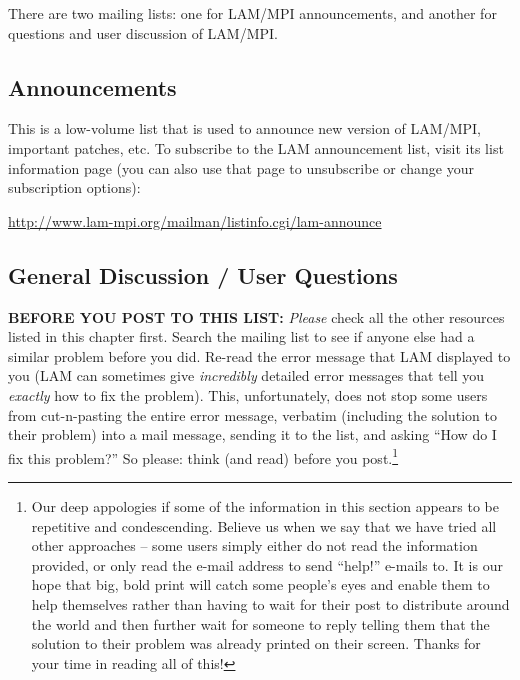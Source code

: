 There are two mailing lists: one for LAM/MPI announcements, and
another for questions and user discussion of LAM/MPI.


\subsection{Announcements}
  
This is a low-volume list that is used to announce new version of
LAM/MPI, important patches, etc.  To subscribe to the LAM announcement
list, visit its list information page (you can also use that page to
unsubscribe or change your subscription options):

\vspace{11pt}

\centerline{\url{http://www.lam-mpi.org/mailman/listinfo.cgi/lam-announce}}

\vspace{11pt}

  

\subsection{General Discussion / User Questions}

{\bf BEFORE YOU POST TO THIS LIST:} {\em Please} check all the other
resources listed in this chapter first.  Search the mailing list to
see if anyone else had a similar problem before you did.  Re-read the
error message that LAM displayed to you (LAM can sometimes give {\em
  incredibly} detailed error messages that tell you {\em exactly} how
to fix the problem).  This, unfortunately, does not stop some users
from cut-n-pasting the entire error message, verbatim (including the
solution to their problem) into a mail message, sending it to the
list, and asking ``How do I fix this problem?''  So please: think (and
read) before you post.\footnote{Our deep appologies if some of the
  information in this section appears to be repetitive and
  condescending.  Believe us when we say that we have tried all other
  approaches -- some users simply either do not read the information
  provided, or only read the e-mail address to send ``help!'' e-mails
  to.  It is our hope that big, bold print will catch some people's
  eyes and enable them to help themselves rather than having to wait
  for their post to distribute around the world and then further wait
  for someone to reply telling them that the solution to their problem
  was already printed on their screen.  Thanks for your time in
  reading all of this!}

